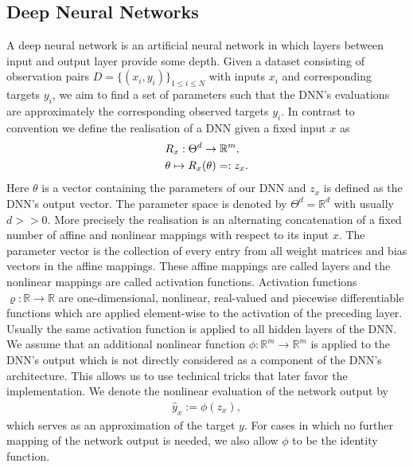 \documentclass[conference]{IEEEtran}
\begin{document}
	\subsection{Deep Neural Networks}
	\noindent
	A deep neural network is an artificial neural network in which layers between input and output layer provide some depth. Given a dataset consisting of observation pairs $D =\{(x_{i}, y_{i})\}_{1\leq i\leq N}$ with inputs $x_{i}$ and corresponding targets $y_{i}$, we aim to find a set of parameters such that the DNN's evaluations are approximately the corresponding observed targets $y_{i}$. In contrast to convention we define the realisation of a DNN given a fixed input $x$ as
	\begin{align}
	&R_{x}:\Theta^{d}\rightarrow\mathbb{R}^{m}, \notag\\
	&\theta\mapsto R_{x}(\theta) =: z_{x}.
	\end{align}
	Here $\theta$ is a vector containing the parameters of our DNN and $z_{x}$ is defined as the DNN's output vector. The parameter space is denoted by $\Theta^{d} = \mathbb{R}^{d}$ with usually $d>>0$. More precisely the realisation is an alternating concatenation of a fixed number of affine and nonlinear mappings with respect to its input $x$. The parameter vector is the collection of every entry from all weight matrices and bias vectors in the affine mappings. These affine mappings are called layers and the nonlinear mappings are called activation functions. Activation functions $\varrho:\mathbb{R}\rightarrow\mathbb{R}$ are one-dimensional, nonlinear, real-valued and piecewise differentiable functions which are applied element-wise to the activation of the preceding layer. Usually the same activation function is applied to all hidden layers of the DNN.\\ We assume that an additional nonlinear function $\phi:\mathbb{R}^{m}\rightarrow\mathbb{R}^{m}$ is applied to the DNN's output which is not directly considered as a component of the DNN's architecture. This allows us to use technical tricks that later favor the implementation. We denote the nonlinear evaluation of the network output by
	\begin{align}
	\hat{y}_{x} := \phi(z_{x}),
	\end{align}
	which serves as an approximation of the target $y$. For cases in which no further mapping of the network output is needed, we also allow $\phi$ to be the identity function.
	
	
\end{document}
